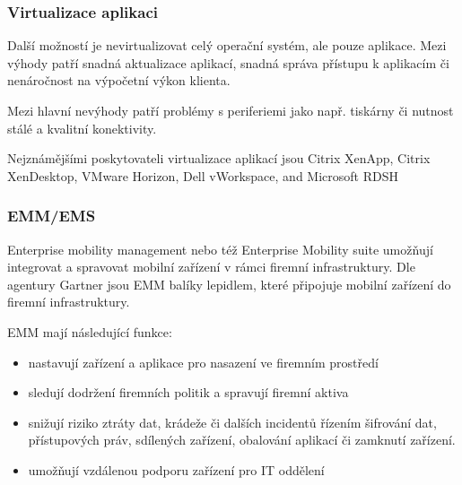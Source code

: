  
 \subsubsection{Virtualizace aplikaci}
 Další možností je nevirtualizovat celý operační systém, ale pouze aplikace. Mezi výhody patří snadná aktualizace aplikací, snadná správa přístupu k aplikacím či nenáročnost na výpočetní výkon klienta.
 
 Mezi hlavní nevýhody patří problémy s periferiemi jako např. tiskárny či nutnost stálé a kvalitní konektivity.
 
  Nejznámějšími poskytovateli virtualizace aplikací jsou Citrix XenApp, Citrix XenDesktop, VMware Horizon, Dell vWorkspace, and Microsoft RDSH
 
 
 \subsubsection{EMM/EMS}
 Enterprise mobility management nebo též Enterprise Mobility suite umožňují integrovat a spravovat mobilní zařízení v rámci firemní infrastruktury.
 Dle agentury Gartner jsou EMM balíky lepidlem, které připojuje mobilní zařízení do firemní infrastruktury. \cite{Gartner_EMM_2016}
 
 EMM mají následující funkce:
 \begin{itemize}
     \item nastavují zařízení a aplikace pro nasazení ve firemním prostředí
     \item sledují dodržení firemních politik a spravují firemní aktiva
     \item snižují riziko ztráty dat, krádeže či dalších incidentů řízením šifrování dat, přístupových práv, sdílených zařízení, obalování aplikací či zamknutí zařízení.
     \item umožňují vzdálenou podporu zařízení pro IT oddělení
 \end{itemize}
 

 
 
 
